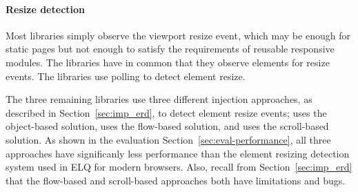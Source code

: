 \documentclass{acm_proc_article-sp}
\newcommand{\gls}[1]{#1}
\begin{document}

  \paragraph{Resize detection}
  Most libraries simply observe the \gls{viewport} resize event, which may be enough for static pages but not enough to satisfy the requirements of reusable responsive modules.
  The libraries \cite{eq_imp_localised-css,eq_imp_selector_queries,eq_imp_prollyfill-min-width,eq_imp_gss,eq_imp_element-queries,eq_imp_css-element-queries} have in common that they observe elements for resize events.
  The libraries \cite{eq_imp_localised-css,eq_imp_selector_queries} use polling to detect element resize.

  The three remaining libraries use three different injection approaches, as described in Section~\ref{sec:imp_erd}, to detect element resize events; \cite{eq_imp_element-queries} uses the object-based solution, \cite{eq_imp_prollyfill-min-width} uses the flow-based solution, and \cite{eq_imp_css-element-queries} uses the scroll-based solution.
  As shown in the evaluation Section~\ref{sec:eval-performance}, all three approaches have significanly less performance than the element resizing detection system used in \gls{ELQ} for modern browsers.
  Also, recall from Section~\ref{sec:imp_erd} that the flow-based and scroll-based approaches both have limitations and bugs.
\end{document}
